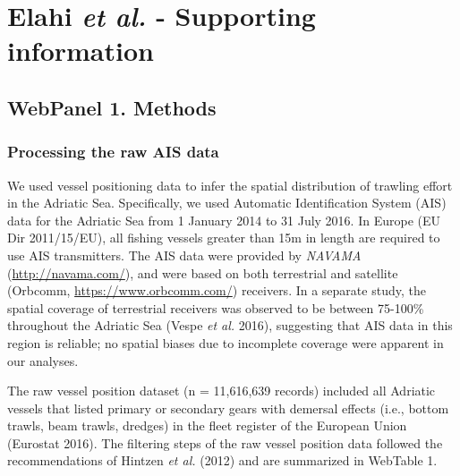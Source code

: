 \documentclass[11pt,]{article}
\title{}
\author{}
\date{}
\begin{document}
\section{\texorpdfstring{Elahi \emph{et al.} - Supporting
information}{Elahi et al. - Supporting information}}\label{elahi-et-al.---supporting-information}

\subsection{WebPanel 1. Methods}\label{webpanel-1.-methods}

\subsubsection{Processing the raw AIS
data}\label{processing-the-raw-ais-data}

We used vessel positioning data to infer the spatial distribution of
trawling effort in the Adriatic Sea. Specifically, we used Automatic
Identification System (AIS) data for the Adriatic Sea from 1 January
2014 to 31 July 2016. In Europe (EU Dir 2011/15/EU), all fishing vessels
greater than 15m in length are required to use AIS transmitters. The AIS
data were provided by \emph{NAVAMA} (\url{http://navama.com/}), and were
based on both terrestrial and satellite (Orbcomm,
\url{https://www.orbcomm.com/}) receivers. In a separate study, the
spatial coverage of terrestrial receivers was observed to be between
75-100\% throughout the Adriatic Sea (Vespe \emph{et al.} 2016),
suggesting that AIS data in this region is reliable; no spatial biases
due to incomplete coverage were apparent in our analyses.

The raw vessel position dataset (n = 11,616,639 records) included all
Adriatic vessels that listed primary or secondary gears with demersal
effects (i.e., bottom trawls, beam trawls, dredges) in the fleet
register of the European Union (Eurostat 2016). The filtering steps of
the raw vessel position data followed the recommendations of Hintzen
\emph{et al.} (2012) and are summarized in WebTable 1.
\end{document}
